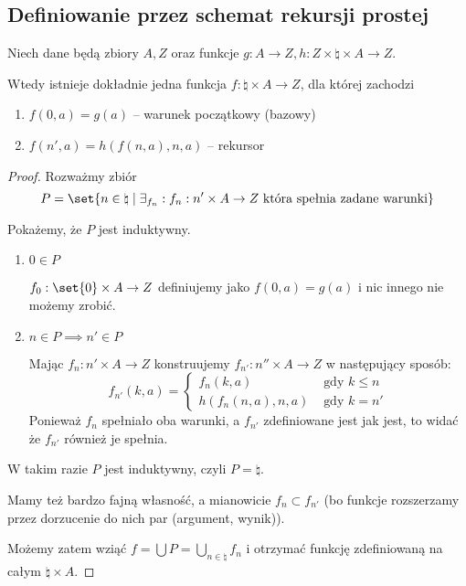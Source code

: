 \subsection{Definiowanie przez schemat rekursji prostej}

\begin{theorem}
Niech dane będą zbiory \( A, Z \) oraz funkcje \( g: A \rightarrow Z, h : Z \times \natural \times A \rightarrow Z \).

Wtedy istnieje dokładnie jedna funkcja \( f : \natural \times A \rightarrow Z \), dla której zachodzi
\begin{enumerate}
    \item \( f(0, a) = g(a) \) -- warunek początkowy (bazowy)
    \item \( f(n', a) = h(f(n, a), n, a) \) -- rekursor
\end{enumerate}
\end{theorem}
\begin{proof}
    Rozważmy zbiór 
    \[
        P = \set{ n \in \natural \mid \exists_{f_n} : f_n : n' \times A \rightarrow Z \text{ która spełnia zadane warunki}}
    \]
    
    Pokażemy, że \( P \) jest induktywny.
    
    \begin{enumerate}
        \item \( 0 \in P \)
            
            \( f_0 : \set{0} \times A \rightarrow Z \) definiujemy jako \( f(0, a) = g(a) \) i nic innego nie możemy zrobić.
            
        \item \( n \in P \implies n' \in P \)
        
            Mając \( f_n : n' \times A \rightarrow Z \) konstruujemy \( f_{n'} : n'' \times A \rightarrow Z \) w następujący sposób:
            \[
                f_{n'}(k, a) = \begin{cases}
                    f_n(k, a) & \text{ gdy } k \leq n \\
                    h(f_n(n, a), n, a) & \text{ gdy } k = n'
                \end{cases}
            \]
            Ponieważ \( f_n \) spełniało oba warunki, a \( f_{n'} \) zdefiniowane jest jak jest, to widać że \( f_{n'} \) również je spełnia.
    \end{enumerate}
    
    W takim razie \( P \) jest induktywny, czyli \( P = \natural \). 
    
    Mamy też bardzo fajną własność, a mianowicie \( f_n \subset f_{n'} \) (bo funkcje rozszerzamy przez dorzucenie do nich par (argument, wynik)).
    
    Możemy zatem wziąć \( f = \bigcup P = \bigcup_{n \in \natural} f_n \) i otrzymać funkcję zdefiniowaną na całym \( \natural \times A \).
\end{proof}
